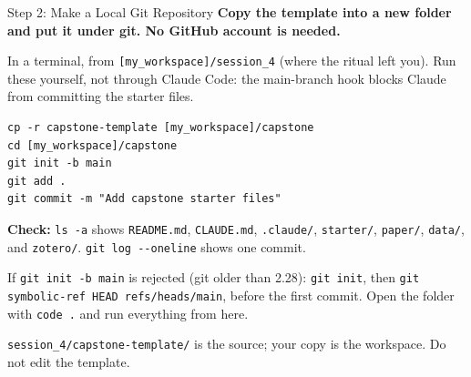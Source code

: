 \documentclass[aspectratio=169, 11pt]{beamer}
\begin{document}
\begin{frame}[fragile]{Step 2: Make a Local Git Repository}
  \textbf{Copy the template into a new folder and put it under git. No GitHub account is needed.}

  \vspace{0.3em}
  {\small In a terminal, from \texttt{[my\_workspace]/session\_4} (where the ritual left you). Run these yourself, not through Claude Code: the main-branch hook blocks Claude from committing the starter files.}

  \vspace{0.3em}
  \begin{lstlisting}[basicstyle=\ttfamily\scriptsize]
cp -r capstone-template [my_workspace]/capstone
cd [my_workspace]/capstone
git init -b main
git add .
git commit -m "Add capstone starter files"
  \end{lstlisting}

  \vspace{0.3em}
  \textbf{Check:} \texttt{ls -a} shows \texttt{README.md}, \texttt{CLAUDE.md}, \texttt{.claude/}, \texttt{starter/}, \texttt{paper/}, \texttt{data/}, and \texttt{zotero/}. \texttt{git log -{}-oneline} shows one commit.

  \vspace{0.3em}
  {\small If \texttt{git init -b main} is rejected (git older than 2.28): \texttt{git init}, then \texttt{git symbolic-ref HEAD refs/heads/main}, before the first commit. Open the folder with \texttt{code .} and run everything from here.}

  \vspace{0.3em}
  \alert{\small \texttt{session\_4/capstone-template/} is the source; your copy is the workspace. Do not edit the template.}
\end{frame}
\end{document}
